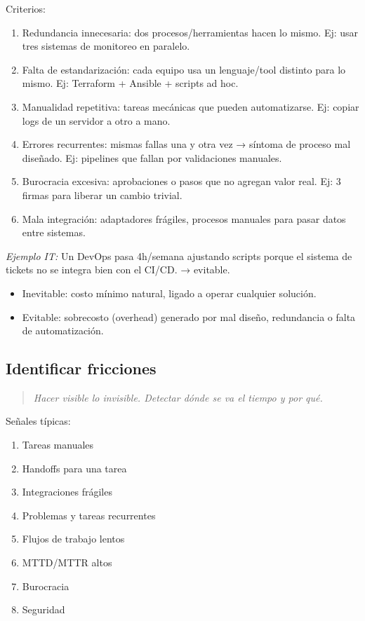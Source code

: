Criterios:
\begin{enumerate}
    \item Redundancia innecesaria: dos procesos/herramientas hacen lo mismo. Ej: usar tres sistemas de monitoreo en paralelo.
    \item Falta de estandarización: cada equipo usa un lenguaje/tool distinto para lo mismo. Ej: Terraform + Ansible + scripts ad hoc.
    \item Manualidad repetitiva: tareas mecánicas que pueden automatizarse. Ej: copiar logs de un servidor a otro a mano.
    \item Errores recurrentes: mismas fallas una y otra vez → síntoma de proceso mal diseñado. Ej: pipelines que fallan por validaciones manuales.
    \item Burocracia excesiva: aprobaciones o pasos que no agregan valor real. Ej: 3 firmas para liberar un cambio trivial.
    \item Mala integración: adaptadores frágiles, procesos manuales para pasar datos entre sistemas.
\end{enumerate}

\textit{Ejemplo IT:} Un DevOps pasa 4h/semana ajustando scripts porque el sistema de tickets no se integra bien con el CI/CD. → evitable.

\begin{itemize}
    \item Inevitable: costo mínimo natural, ligado a operar cualquier solución.
    \item Evitable: sobrecosto (overhead) generado por mal diseño, redundancia o falta de automatización.
\end{itemize}

\subsection*{Identificar fricciones}

\begin{quote}
\textit{Hacer visible lo invisible. Detectar dónde se va el tiempo y por qué.}
\end{quote}

Señales típicas:
\begin{enumerate}
    \item Tareas manuales
    \item Handoffs para una tarea
    \item Integraciones frágiles
    \item Problemas y tareas recurrentes
    \item Flujos de trabajo lentos
    \item MTTD/MTTR altos
    \item Burocracia
    \item Seguridad
\end{enumerate}

